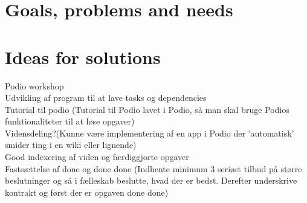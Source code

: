 \section{Goals, problems and needs}

\section{Ideas for solutions}
Podio workshop\\
Udvikling af program til at lave tasks og dependencies\\
Tutorial til podio (Tutorial til Podio lavet i Podio, så man skal bruge Podios funktionaliteter til at løse opgaver)\\
Vidensdeling?(Kunne være implementering af en app i Podio der 'automatisk' smider ting i en wiki eller lignende)\\
Good indexering af viden og færdiggjorte opgaver\\
Fastsættelse af done og done done (Indhente minimum 3 seriøst tilbud på større beslutninger og så i fælleskab beslutte, hvad der er bedst. Derefter underskrive kontrakt
og først der er opgaven done done)


